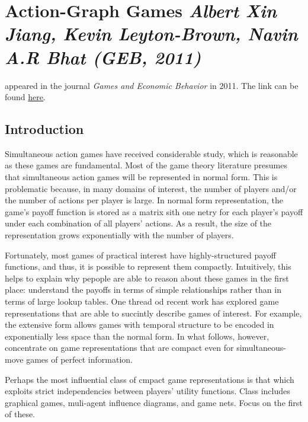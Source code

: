 \newpage
\section{Action-Graph Games \textit{\small Albert Xin Jiang, Kevin Leyton-Brown, Navin A.R Bhat (GEB, 2011)}}
\citet{AGG-2011} appeared in the journal \emph{Games and Economic Behavior} in 2011. The link can be found \href{https://www.sciencedirect.com/science/article/abs/pii/S0899825610001752}{here}.

\subsection{Introduction}

Simultaneous action games have received considerable study, which is reasonable as these games are fundamental. Most of the game theory literature presumes that simultaneous action games will be represented in normal form. This is problematic because, in many domains of interest, the number of players and/or the number of actions per player is large. In normal form representation, the game's payoff function is stored as a matrix sith one netry for each player's payoff under each combination of all players' actions. As a result, the size of the representation grows exponentially with the number of players. 

Fortunately, most games of practical interest have highly-structured payoff functions, and thus, it is possible to represent them compactly. Intuitively, this helps to explain why pepople are able to reason about these games in the first place: understand the payoffs in terms of simple relationships rather than in terms of large lookup tables. One thread od recent work has explored game representations that are able to succintly describe games of interest. For example, the extensive form allows games with temporal structure to be encoded in exponentially less space than the normal form. In what follows, however, concentrate on game representations that are compact even for simultaneous-move games of perfect information. 

Perhaps the most influential class of cmpact game representations is that which exploits strict independencies between players' utility functions. Class includes graphical games, muli-agent influence diagrams, and game nets. Focus on the first of these. 

